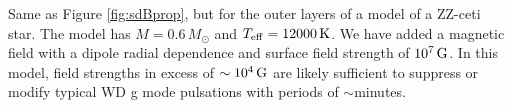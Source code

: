 \label{fig:WDProp}
Same as Figure \ref{fig:sdBprop}, but for the outer layers of a model of a ZZ-ceti star. The model has $M=0.6\,M_\odot$ and $T_{\rm eff} = 12000 \, {\rm K}$. We have added a magnetic field with a dipole radial dependence and surface field strength of $10^7 \, {\rm G}$. In this model, field strengths in excess of $\sim 10^4 \, {\rm G}$ are likely sufficient to suppress or modify typical WD g mode pulsations with periods of $\sim$minutes.